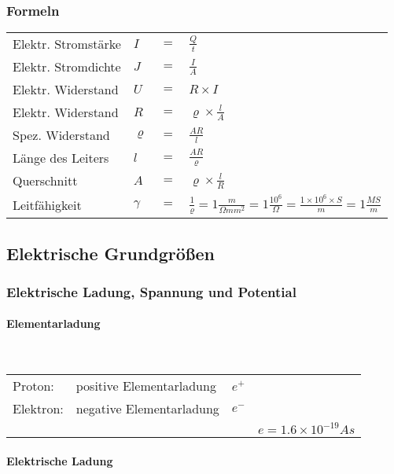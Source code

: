 \subsubsection{Formeln}
\begin{tabular}{llll}
Elektr. Stromstärke	& $I$ & $=$ & $\frac{Q}{t}$\\
Elektr. Stromdichte	& $J$ & $=$ & $\frac{I}{A}$\\
Elektr. Widerstand 	& $U$ & $=$ & $R\times I$\\
Elektr. Widerstand	& $R$ & $=$ & $\varrho\times\frac{l}{A}$\\
Spez. Widerstand		& $\varrho$	& $=$ & $\frac{AR}{l}$\\
Länge des Leiters	& $l$		& $=$ & $\frac{AR}{\varrho}$\\
Querschnitt			& $A$		& $=$ & $\varrho\times\frac{l}{R}$\\
Leitfähigkeit		& $\gamma$	& $=$ & $\frac{1}{\varrho} = 1\frac{m}{\Omega mm^2} = 1\frac{10^6}{\Omega} = \frac{1\times 10^6\times S}{m} = 1\frac{MS}{m}$
\end{tabular}


\subsection{Elektrische Grundgrößen}
	\subsubsection{Elektrische Ladung, Spannung und Potential}
		\paragraph{Elementarladung}~\\
		
\begin{tabular}{llll}
Proton:		& positive Elementarladung &	$e^+$ & \\
Elektron:	& negative Elementarladung &	$e^-$ & \\
& &	& $e = 1.6 \times 10^{-19} As$ \\
\end{tabular}

		\paragraph{Elektrische Ladung}~\\
		
